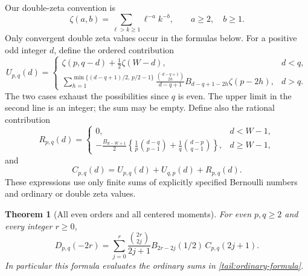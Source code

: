 \documentclass[11pt,a4paper]{article}
\numberwithin{equation}{section}
\newtheorem{theorem}{Theorem}[section]
\theoremstyle{definition}
\theoremstyle{remark}
\begin{document}
Our double-zeta convention is
\[
 \zeta(a,b)=\sum_{\ell>k\ge1}\ell^{-a}k^{-b},
 \qquad a\ge2,\quad b\ge1.
\]
Only convergent double zeta values occur in the formulas below.
For a positive odd integer \(d\), define the ordered contribution
\begin{equation}\label{tail:ordered-block}
 U_{p,q}(d)=
 \begin{cases}
 \displaystyle
 \zeta(p,q-d)+\frac12\zeta(W-d),&d<q,\\[6pt]
 \displaystyle
 \sum_{h=1}^{\min\{(d-q+1)/2,\,p/2-1\}}
 \frac{\binom{d-q+1}{2h}}{d-q+1}
 B_{d-q+1-2h}\zeta(p-2h),&d>q.
 \end{cases}
\end{equation}
The two cases exhaust the possibilities since \(q\) is even.
The upper limit in the second line is an integer; the sum may be
empty. Define also the rational contribution
\begin{equation}\label{tail:rational-block}
 R_{p,q}(d)=
 \begin{cases}
 0,&d<W-1,\\[3pt]
 \displaystyle
 -\frac{B_{d-W+1}}2
 \left\{\frac1p\binom{d-q}{p-1}
          +\frac1q\binom{d-p}{q-1}\right\},&d\ge W-1,
 \end{cases}
\end{equation}
and
\begin{equation}\label{tail:block}
 C_{p,q}(d)=U_{p,q}(d)+U_{q,p}(d)+R_{p,q}(d).
\end{equation}
These expressions use only finite sums of explicitly specified
Bernoulli numbers and ordinary or double zeta values.

\begin{theorem}[All even orders and all centered moments]
\label{tail:all-moments}
For even \(p,q\ge2\) and every integer \(r\ge0\),
\begin{equation}\label{tail:moment-formula}
 \boxed{
 D_{p,q}(-2r)=
 \sum_{j=0}^{r}\frac{\binom{2r}{2j}}{2j+1}
 B_{2r-2j}(1/2)\,C_{p,q}(2j+1).}
\end{equation}
In particular this formula evaluates the ordinary sums in
\eqref{tail:ordinary-formula}.
\end{theorem}
\end{document}
